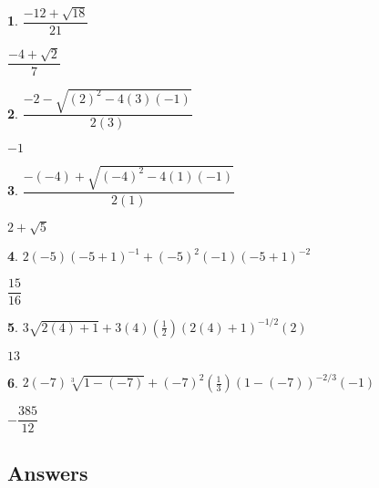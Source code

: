 \documentclass{amsbook}
\newtheorem{exc}{}
\newenvironment{ex}{\begin{exc}\normalfont}{\end{exc}}
\numberwithin{section}{chapter}
\numberwithin{equation}{chapter}
\begin{document}
\begin{multicols}{3}
\begin{ex}
	$\dfrac{-12 + \sqrt{18}}{21}$
	\begin{sol}
	 $\dfrac{-4 + \sqrt{2}}{7}$	
	\end{sol}
\end{ex}

\begin{ex}
	$\dfrac{-2 - \sqrt{(2)^2 - 4(3)(-1)}}{2(3)}$
	\begin{sol}
		$-1$
	\end{sol}
\end{ex}

\begin{ex}
	 $\dfrac{-(-4) + \sqrt{(-4)^2 - 4(1)(-1)}}{2(1)}$
	\begin{sol}
		$2 + \sqrt{5}$
	\end{sol}
\end{ex}
\end{multicols}

\begin{ex}
	$2(-5)(-5+1)^{-1} + (-5)^2(-1)(-5+1)^{-2}$
	\begin{sol}
		$\dfrac{15}{16}$
	\end{sol}
\end{ex}

\begin{ex}
	$3\sqrt{2(4)+1} + 3(4)\left(\frac{1}{2}\right)(2(4)+1)^{-1/2}(2)$
	\begin{sol}
		$13$
	\end{sol}
\end{ex}

\begin{ex}
	$2(-7)\sqrt[3]{1-(-7)} + (-7)^2 \left(\frac{1}{3}\right)(1-(-7))^{-2/3}(-1)$
	\begin{sol}
		$-\dfrac{385}{12}$
	\end{sol}
\end{ex}





\subsection*{Answers \nopunct} \hfill
\begin{multicols}{3}
	
\end{multicols}




\newpage
\end{document}
